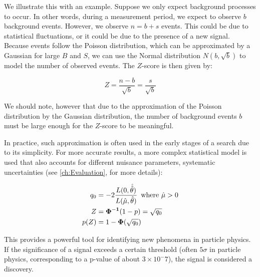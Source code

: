 We illustrate this with an example. Suppose we only expect background processes to occur. In other words, during a
measurement period, we expect to observe $b$ background events. However, we observe $n=b+s$ events. This
could be due to statistical fluctuations, or it could be due to the presence of a new signal. Because events follow the
Poisson distribution, which can be approximated by a Gaussian for large $B$ and $S$, we can use the Normal distribution
$N(b, \sqrt{b})$ to model the number of observed events. The $Z$-score is then given by:

\begin{equation}
    Z = \frac{n-b}{\sqrt{b}} = \frac{s}{\sqrt{b}}
\end{equation}

We should note, however that due to the approximation of the Poisson distribution by the Gaussian distribution, the
number of background events $b$ must be large enough for the $Z$-score to be meaningful.

In practice, such approximation is often used in the early stages of a search due to its simplicity. For more accurate
results, a more complex statistical model is used that also accounts for different nuisance parameters, systematic
uncertainties (see \autoref{ch:Evaluation}, \cite{pract-stat-lhc, statistical} for more details):

\begin{align}
    q_0  & = -2 \frac{L(0, \hat{\hat{\theta}})}{L(\hat{\mu}, \hat{\theta})} \, \text{ where $\hat{\mu} > 0$} \\
    Z    & = \mathbf{\Phi^{-1}}(1 - p) = \sqrt{q_0}                                                                     \\
    p(Z) & = 1 - \mathbf{\Phi}(\sqrt{q_0})
\end{align}


This provides a powerful tool for identifying new phenomena in particle physics. If the significance of a signal exceeds
a certain threshold (often $ 5 \sigma $ in particle physics, corresponding to a p-value of about $3\times10^-7$), the signal is
considered a discovery.